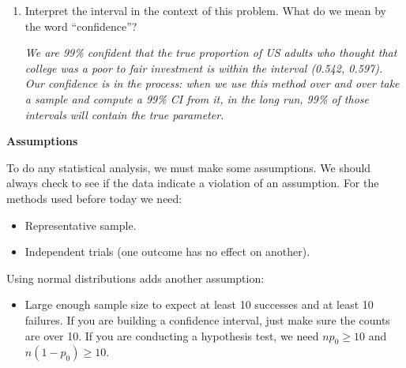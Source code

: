 \begin{enumerate}
\begin{enumerate}
     How similar is the standard error from \ref{propSE} to the
     bootstrap SE?        
\begin{students}
        \vspace{2cm}         
\end{students}

\begin{key}
  {\it Very close. Off just by round off error?}
\end{key}

\item Interpret the interval in the context of this problem.  What do
  we mean by the word ``confidence''?    
\begin{students}
        \vspace{3cm}        
\end{students}

\begin{key}
  {\it We are 99\% confident that the true proportion of US adults
  who thought that college was a poor to fair investment is within the
interval (0.542, 0.597). Our confidence is in the process: when we use
this method over and over take a sample and compute a 99\% CI from it,
in the long run, 99\% of those intervals will contain the true parameter.}
\end{key}
     \end{enumerate}
   \end{enumerate}
 

     \begin{center}
       {\large\bf Assumptions}
     \end{center}

  To do any statistical analysis, we must make some assumptions.  We
  should always check to see if the data indicate a violation of an
  assumption. For the methods used before today we need:
     \begin{itemize}
     \item Representative sample. 
     \item Independent trials (one outcome has no effect on another).  
     \end{itemize}
   
  Using normal distributions adds another assumption:
   \begin{itemize}
     \item Large enough sample size to expect at least 10
       successes   and  at least 10  failures.  If you are building a
       confidence interval, just make sure the counts are over 10. If
       you are conducting a hypothesis test, we need $np_0\geq 10$ and
       $n(1-p_0) \geq 10$. 
     \end{itemize}\vspace{1cm}


